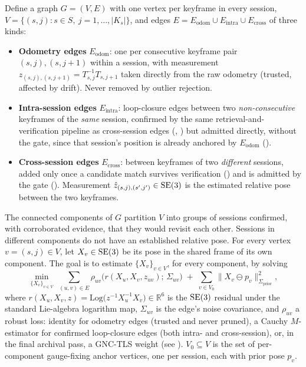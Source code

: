 Define a graph $G = (V, E)$ with one vertex per keyframe in every session,
$V = \{ (s,j) : s \in S,\ j = 1,\dots,|K_s| \}$, and edges $E = E_{\mathrm{odom}} \cup
E_{\mathrm{intra}} \cup E_{\mathrm{cross}}$ of three kinds:
\begin{itemize}
  \item \textbf{Odometry edges} $E_{\mathrm{odom}}$: one per consecutive keyframe pair
    $(s,j),(s,j{+}1)$ within a session, with measurement $z_{(s,j),(s,j+1)} = T_{s,j}^{-1}
    T_{s,j+1}$ taken directly from the raw odometry (trusted, affected by drift). Never removed
    by outlier rejection.
  \item \textbf{Intra-session edges} $E_{\mathrm{intra}}$: loop-closure edges between two
    \emph{non-consecutive} keyframes of the \emph{same} session, confirmed by the same
    retrieval-and-verification pipeline as cross-session edges
    (, ) but
    admitted directly, without the gate, since that session's position is already anchored
    by $E_{\mathrm{odom}}$ ().
  \item \textbf{Cross-session edges} $E_{\mathrm{cross}}$: between keyframes of two
    \emph{different} sessions, added only once a candidate match survives verification
    () and is admitted by the gate
    (). Measurement $\hat{z}_{(s,j),(s',j')} \in \mathrm{SE}(3)$ is the
    estimated relative pose between the two keyframes.
\end{itemize}
The connected components of $G$ partition $V$ into groups of sessions confirmed, with
corroborated evidence, that they would revisit each other. Sessions in different components do not have an
established relative pose. For every vertex $v = (s,j) \in V$, let $X_v \in \mathrm{SE}(3)$ be its
pose in the shared frame of its own component. The goal is to estimate $\{X_v\}_{v \in V}$, for
every component, by solving
\begin{equation}
  \label{eq:method-pgo-objective}
  \min_{\{X_v\}_{v \in V}} \;
  \sum_{(u,v) \in E} \rho_{uv}\!\Big( r(X_u, X_v, z_{uv});\, \Sigma_{uv} \Big)
  \;+\; \sum_{v \in V_0} \big\| X_v \ominus p_v \big\|^2_{\Sigma_{\mathrm{prior}}},
\end{equation}
where $r(X_u,X_v,z) = \mathrm{Log}\!\big(z^{-1} X_u^{-1} X_v\big) \in \mathbb{R}^6$ is the
$\mathrm{SE}(3)$ residual under the standard Lie-algebra logarithm map, $\Sigma_{uv}$ is the edge's
noise covariance, and $\rho_{uv}$ a robust loss: identity for odometry edges (trusted and never
pruned), a Cauchy $M$-estimator for confirmed loop-closure edges (both intra- and
cross-session), or, in the final archival pass, a GNC-TLS weight (see
). $V_0 \subseteq V$ is the set of per-component gauge-fixing
anchor vertices, one per session, each with prior pose $p_v$.

